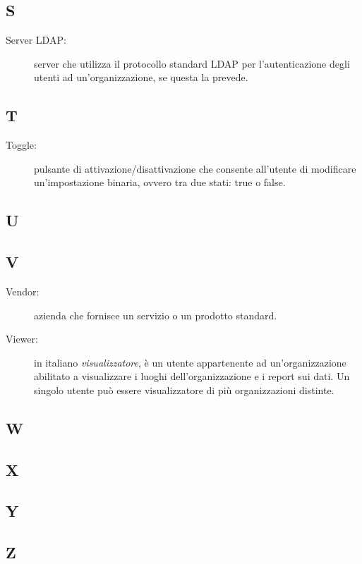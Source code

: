 \documentclass[../manuale-utente.tex]{subfiles}
\begin{document}
\subsection{S}
\begin{description}
    \item[Server LDAP:] server che utilizza il protocollo standard LDAP per l'autenticazione degli utenti ad un'organizzazione, se questa la prevede.
\end{description}

\subsection{T}
\begin{description}
  \item[Toggle:] pulsante di attivazione/disattivazione che consente all'utente di modificare un'impostazione binaria, ovvero tra due stati: true o false.
\end{description}

\subsection{U}

\subsection{V}
\begin{description}
    \item[Vendor:] azienda che fornisce un servizio o un prodotto standard.
    \item[Viewer:] in italiano \textit{visualizzatore}, è un utente appartenente ad un'organizzazione abilitato a visualizzare i luoghi dell'organizzazione e i report sui dati. Un singolo utente può essere visualizzatore di più organizzazioni distinte.
\end{description}

\subsection{W}

\subsection{X}

\subsection{Y}

\subsection{Z}
\end{document}
